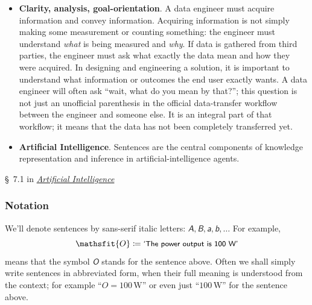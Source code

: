 \documentclass[
  a4paper,
  DIV=11,
  numbers=noendperiod,
  oneside]{scrreprt}
\begin{document}
\begin{itemize}
\item
  \textbf{Clarity, analysis, goal-orientation}. A data engineer must
  acquire information and convey information. Acquiring information is
  not simply making some measurement or counting something: the engineer
  must understand \emph{what} is being measured and \emph{why}. If data
  is gathered from third parties, the engineer must ask what exactly the
  data mean and how they were acquired. In designing and engineering a
  solution, it is important to understand what information or outcomes
  the end user exactly wants. A data engineer will often ask ``wait,
  what do you mean by that?''; this question is not just an unofficial
  parenthesis in the official data-transfer workflow between the
  engineer and someone else. It is an integral part of that workflow; it
  means that the data has not been completely transferred yet.
\item
  \textbf{Artificial Intelligence}. Sentences are the central components
  of knowledge representation and inference in artificial-intelligence
  agents.
\end{itemize}

\begin{tcolorbox}[enhanced jigsaw, titlerule=0mm, toprule=.15mm, toptitle=1mm, bottomrule=.15mm, leftrule=.75mm, title={\faIcon{book-open} Reading}, arc=.35mm, breakable, left=2mm, coltitle=black, colframe=quarto-callout-caution-color-frame, colbacktitle=quarto-callout-caution-color!10!white, bottomtitle=1mm, rightrule=.15mm, opacitybacktitle=0.6, opacityback=0, colback=white]

§~7.1 in
\href{https://hvl.instructure.com/courses/25074/modules/items/660089}{\emph{Artificial
Intelligence}}

\end{tcolorbox}

\hypertarget{notation-1}{%
\subsubsection{Notation}\label{notation-1}}

We'll denote sentences by sans-serif italic letters:
\(\mathsfit{A},\mathsfit{B},\mathsfit{a},\mathsfit{b},\dotsc\) For
example, \[
\mathsfit{O} \coloneqq \textsf{\small`The power output is 100 W'}
\] means that the symbol \(\mathsfit{O}\) stands for the sentence above.
Often we shall simply write sentences in abbreviated form, when their
full meaning is understood from the context; for example
{``\(O = 100\,\mathrm{W}\)''} or even just {``\(100\,\mathrm{W}\)''} for
the sentence above.
\end{document}
